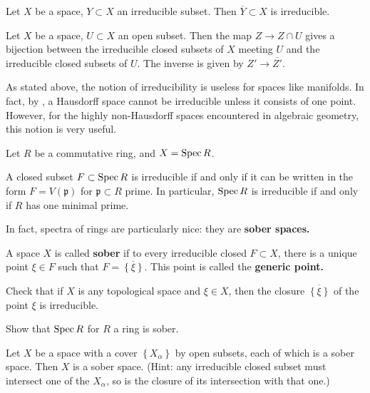 \begin{exercise} 
Let $X$ be a space, $Y \subset X$ an irreducible subset. Then 
$\overline{Y} \subset X$ is irreducible.
\end{exercise} 

\begin{exercise} 
Let $X$ be a space, $U \subset X$ an open subset. 
Then the map $Z \to Z \cap U$ gives a bijection between the irreducible
closed subsets of $X$ meeting $U$ and the irreducible closed subsets of $U$.
The inverse is given by $Z' \to \overline{Z'}$.
\end{exercise} 

As stated above, the  notion of irreducibility is useless for spaces
like manifolds. In fact, by , a
Hausdorff space cannot be irreducible unless it consists of one point.
However, for the highly non-Hausdorff spaces encountered in algebraic geometry, this notion is very
useful.

Let $R$ be a commutative ring, and $X = \operatorname{Spec} R$.

\begin{exercise} 
A closed subset $F \subset \operatorname{Spec} R$ is irreducible if and only if it can be
written in the form $F = V(\mathfrak{p})$ for $\mathfrak{p} \subset R$ prime.
In particular, $\operatorname{Spec} R$ is irreducible if and only if $R$ has one minimal
prime. 
\end{exercise} 

In fact, spectra of rings are particularly nice: they are \textbf{sober
spaces.}
\begin{definition} 
A space $X$ is called \textbf{sober} if to every irreducible closed $F \subset
X$, there is a unique point $\xi \in F$ such that $F = \overline{ \left\{\xi\right\}}$. 
This point is called the \textbf{generic point.}
\end{definition} 

\begin{exercise} 
Check that if $X$ is any topological space and $\xi  \in X$, then the closure
$\overline{\left\{\xi\right\}}$ of the point $\xi$ is irreducible.
\end{exercise} 

\begin{exercise} 
Show that $\operatorname{Spec} R$ for $R$ a ring is sober.
\end{exercise} 

\begin{exercise} 
Let $X$ be a space with a cover $\left\{X_\alpha\right\}$ by open subsets,
each of which is a sober space. Then $X$ is a sober space. (Hint: any
irreducible closed subset must intersect one of the $X_\alpha$, so is the
closure of its intersection with that one.)
\end{exercise} 

